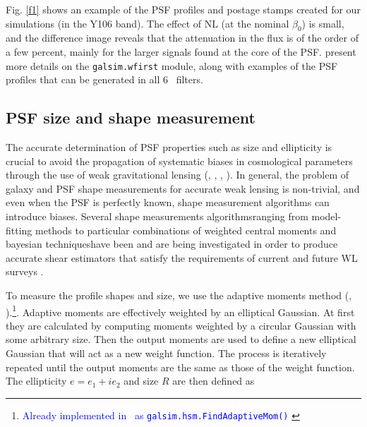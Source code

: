 \documentclass[preprint]{aastex}
\begin{document}
Fig. \ref{f1} shows an example of the PSF profiles and postage stamps created for our simulations (in the Y106 band). The effect of NL (at the nominal $\beta_0$) is small, and the difference image reveals that the attenuation in the flux is of the order of a few percent, mainly for the larger signals found at the core of the PSF.  \citealt{kannawadi15} present more details on the {\tt{galsim.wfirst}} module, along with examples of the PSF profiles that can be generated in all 6 \wfa\ filters. 
\subsection {PSF size and shape measurement}
The accurate determination of PSF properties such as size and ellipticity is crucial to avoid the propagation of systematic biases in cosmological parameters through the use of weak gravitational lensing (\citealt{paulin08}, \citealt{paulin09}, \citealt{massey13}, \citealt{cropper13}). In general, the problem of galaxy and PSF shape measurements for accurate weak lensing is non-trivial, and even when the PSF is perfectly known, shape measurement algorithms can introduce biases. Several shape measurements algorithms\textemdash ranging from model-fitting methods to particular combinations of weighted central moments and bayesian techniques\textemdash have been and are being investigated in order to produce accurate shear estimators that satisfy the requirements of current and future WL surveys \citep{mandelbaum15}.

To measure the profile shapes and size, we use the adaptive moments method (\citealt{bernstein02}, \citealt{hirata03}).\footnote{\textcolor{blue}{Already implemented in \gs\ as {\tt{galsim.hsm.FindAdaptiveMom()}} }}. Adaptive moments are effectively weighted by an elliptical Gaussian. At first they are calculated by computing moments weighted by a circular Gaussian with some arbitrary size. Then the output moments are used to define a new elliptical Gaussian that will act as a new weight function. The process is iteratively repeated until the output moments are the same as those of the weight function. The ellipticity $e=e_1 + ie_2$ and size $R$ are then defined as
\end{document}
